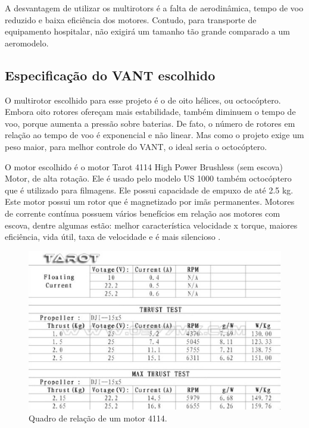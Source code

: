 A desvantagem de utilizar os multirotors é a falta de aerodinâmica, tempo de voo reduzido e baixa eficiência dos motores. Contudo, para transporte de equipamento hospitalar, não exigirá um tamanho tão grande comparado a um aeromodelo.

\subsection{Especificação do VANT escolhido}

O multirotor escolhido para esse projeto é o de oito hélices, ou octocóptero. Embora oito rotores ofereçam mais estabilidade, também diminuem o tempo de voo, porque aumenta a pressão sobre baterias. De fato, o número de rotores em relação ao tempo de voo é exponencial e não linear. Mas como o projeto exige um peso maior, para melhor controle do VANT, o ideal seria o octocóptero. 

O motor escolhido é o motor Tarot 4114 High Power Brushless (sem escova) Motor, de alta rotação. Ele é usado pelo modelo US 1000 também octocóptero que é utilizado para filmagens. Ele possui capacidade de empuxo de até 2.5 kg. Este motor possui um rotor que é magnetizado por imãs permanentes. Motores de corrente contínua possuem vários benefícios em relação aos motores com escova, dentre algumas estão: melhor característica velocidade x torque, maiores eficiência, vida útil, taxa de velocidade e é mais silencioso \cite{nascimento}.

\begin{figure}[h!]
    \centering
      \includegraphics[keepaspectratio=true,scale=0.5]{figuras/tarot.eps}
    \caption{Quadro de relação de um motor 4114.}
    \label{fig:tarot}
\end{figure}

